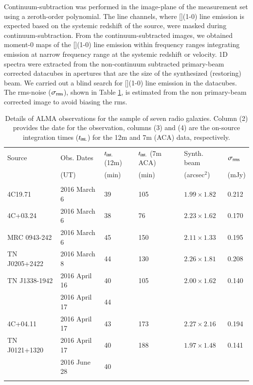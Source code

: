 Continuum-subtraction was performed in the image-plane of the measurement set using a zeroth-order polynomial. The line channels, where [](1-0) line emission is expected based on the systemic redshift of the source, were masked during continuum-subtraction. From the continuum-subtracted images, we obtained moment-0 maps of the [](1-0) line emission within frequency ranges integrating emission at narrow frequency range at the systemic redshift or velocity. 1D spectra were extracted from the non-continuum subtracted primary-beam corrected datacubes in apertures that are the size of the synthesized (restoring) beam. We carried out a blind search for [](1-0) line emission in the datacubes. The rms-noise ($\sigma_{\rm rms}$), shown in Table \ref{table:hzrgs-obs-alma}, is estimated from the non primary-beam corrected image to avoid biasing the rms. 

\begin{table}
	\centering
	\caption[ALMA observing details for seven HzRGs]{Details of ALMA observations for the sample of seven radio galaxies. Column (2) provides the date for the observation, columns (3) and (4) are the on-source integration times ($t_{\rm int.}$) for the 12m and 7m (ACA) data, respectively.}
	\label{table:hzrgs-obs-alma}
	\begin{tabular}{ l | l l l l l } 
	\hline \hline
	Source & Obs. Dates 	& $t_{\rm int.}$ (12m)  & $t_{\rm int.}$ (7m ACA) 	& Synth. beam & $\sigma_{\rm rms}$   \\
				& (UT) 		& (min)  				& (min) 					& (arcsec$^2$)& (mJy) 	 \\
				& & &  \\
	\hline 
	4C19.71 			& 2016 March 6 	& 39 &  105	& $1.99 \times 1.82$ & 0.212 \\
	4C+03.24 			& 2016 March 6 	& 38 &  76	& $2.23 \times 1.62$ & 0.170 \\
	MRC 0943-242 		& 2016 March 6 	& 45 &  150	& $2.11 \times 1.33$ & 0.195 \\
	TN J0205+2422 		& 2016 March 8  & 44 &  130	& $2.26 \times 1.81$ & 0.208 \\
	TN J1338-1942		& 2016 April 16	& 40 &  105	& $2.00 \times 1.62$ & 0.140 \\
						& 2016 April 17 & 44 &   		& \\
	4C+04.11 			& 2016 April 17 & 43 &  173	& $2.27 \times 2.16$ & 0.194 \\
	TN J0121+1320 		& 2016 April 17 & 40 &  188	& $1.97 \times 1.48$ & 0.141 \\
						& 2016 June 28	& 40 &   		& \\
	& & &   \\
	\hline
	\end{tabular}
\end{table}

